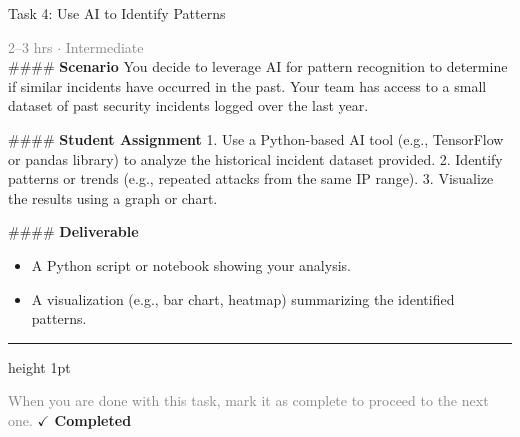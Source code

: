 \documentclass[10pt,a4paper]{article}
\begin{document}
\begin{taskbox}{Task 4: Use AI to Identify Patterns}

    {\small \textcolor{gray}{2--3 hrs $\cdot$ Intermediate}}\\[12pt]

    \#\#\#\# \textbf{Scenario}  
You decide to leverage AI for pattern recognition to determine if similar incidents have occurred in the past. Your team has access to a small dataset of past security incidents logged over the last year.

\#\#\#\# \textbf{Student Assignment}  
1. Use a Python-based AI tool (e.g., TensorFlow or pandas library) to analyze the historical incident dataset provided.  
2. Identify patterns or trends (e.g., repeated attacks from the same IP range).  
3. Visualize the results using a graph or chart.  

\#\#\#\# \textbf{Deliverable}  
\begin{itemize}
    \item A Python script or notebook showing your analysis.  
    \item A visualization (e.g., bar chart, heatmap) summarizing the identified patterns.\par
\end{itemize}

    \vspace{16pt}

    \textcolor{cardBorder}{\hrule height 1pt}\vspace{8pt}

    \small \textcolor{gray}{When you are done with this task, mark it as complete to proceed to the next one.} \hfill \textbf{\textcolor{brandDark}{$\checkmark$ Completed}}

\end{taskbox}
\end{document}
